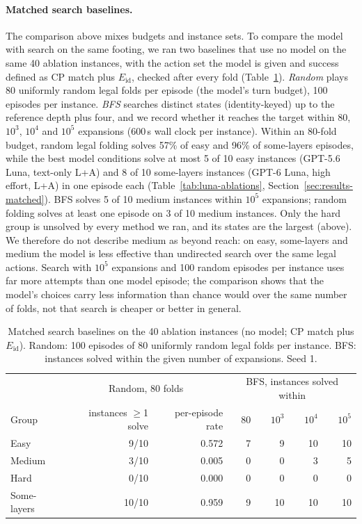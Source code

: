 \paragraph{Matched search baselines.} The comparison above mixes budgets and instance sets. To
compare the model with search on the same footing, we ran two baselines that use no model on the
same 40 ablation instances, with the action set the model is given and success defined as CP match
plus $E_{\mathrm{id}}$, checked after every fold (Table~\ref{tab:matched-baselines}). \emph{Random}
plays 80 uniformly random legal folds per episode (the model's turn budget), 100 episodes per
instance. \emph{BFS} searches distinct states (identity-keyed) up to the reference depth plus four,
and we record whether it reaches the target within 80, $10^3$, $10^4$ and $10^5$ expansions (600\,s
wall clock per instance). Within an 80-fold budget, random legal folding solves 57\% of easy and 96\%
of some-layers episodes, while the best model conditions solve at most 5 of 10 easy instances
(GPT-5.6 Luna, text-only L+A) and 8 of 10 some-layers instances (GPT-6 Luna, high effort, L+A)
in one episode each (Table~\ref{tab:luna-ablations}, Section~\ref{sec:results-matched}).
BFS solves 5 of 10 medium instances within $10^5$ expansions; random folding solves at least one
episode on 3 of 10 medium instances. Only the hard group is unsolved by every method we ran, and
its states are the largest (above). We therefore do not describe medium as beyond reach: on easy,
some-layers and medium the model is less effective than undirected search over the same legal
actions. Search with $10^5$ expansions and 100 random episodes per instance uses far more
attempts than one model episode; the comparison shows that the model's choices carry less
information than chance would over the same number of folds, not that search is cheaper or
better in general.

\begin{table}[htbp]
\centering
\caption{Matched search baselines on the 40 ablation instances (no model; CP match plus
$E_{\mathrm{id}}$). Random: 100 episodes of 80 uniformly random legal folds per instance. BFS:
instances solved within the given number of expansions. Seed 1.}
\label{tab:matched-baselines}
\small
\setlength{\tabcolsep}{4pt}
\begin{tabular}{lrrrrrr}
\hline
 & \multicolumn{2}{c}{Random, 80 folds} & \multicolumn{4}{c}{BFS, instances solved within} \\
Group & instances $\geq$1 solve & per-episode rate & 80 & $10^3$ & $10^4$ & $10^5$ \\
\hline
Easy & 9/10 & 0.572 & 7 & 9 & 10 & 10 \\
Medium & 3/10 & 0.005 & 0 & 0 & 3 & 5 \\
Hard & 0/10 & 0.000 & 0 & 0 & 0 & 0 \\
Some-layers & 10/10 & 0.959 & 9 & 10 & 10 & 10 \\
\hline
\end{tabular}
\end{table}

